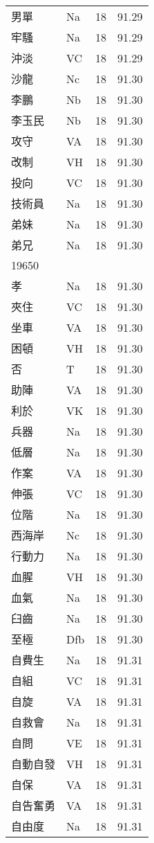 \documentclass[twocolumn]{book}
\begin{document}
\begin{supertabular}{llrr}
男單 & Na & 18 &  91.29\\
牢騷 & Na & 18 &  91.29\\
沖淡 & VC & 18 &  91.29\\
沙龍 & Nc & 18 &  91.30\\
李鵬 & Nb & 18 &  91.30\\
李玉民 & Nb & 18 &  91.30\\
攻守 & VA & 18 &  91.30\\
改制 & VH & 18 &  91.30\\
投向 & VC & 18 &  91.30\\
技術員 & Na & 18 &  91.30\\
弟妹 & Na & 18 &  91.30\\
弟兄 & Na & 18 &  91.30\\
19650\\
孝 & Na & 18 &  91.30\\
夾住 & VC & 18 &  91.30\\
坐車 & VA & 18 &  91.30\\
困頓 & VH & 18 &  91.30\\
否 & T & 18 &  91.30\\
助陣 & VA & 18 &  91.30\\
利於 & VK & 18 &  91.30\\
兵器 & Na & 18 &  91.30\\
低層 & Na & 18 &  91.30\\
作案 & VA & 18 &  91.30\\
伸張 & VC & 18 &  91.30\\
位階 & Na & 18 &  91.30\\
西海岸 & Nc & 18 &  91.30\\
行動力 & Na & 18 &  91.30\\
血腥 & VH & 18 &  91.30\\
血氣 & Na & 18 &  91.30\\
臼齒 & Na & 18 &  91.30\\
至極 & Dfb & 18 &  91.30\\
自費生 & Na & 18 &  91.31\\
自組 & VC & 18 &  91.31\\
自旋 & VA & 18 &  91.31\\
自救會 & Na & 18 &  91.31\\
自問 & VE & 18 &  91.31\\
自動自發 & VH & 18 &  91.31\\
自保 & VA & 18 &  91.31\\
自告奮勇 & VA & 18 &  91.31\\
自由度 & Na & 18 &  91.31\\

\end{supertabular}
\end{document}
